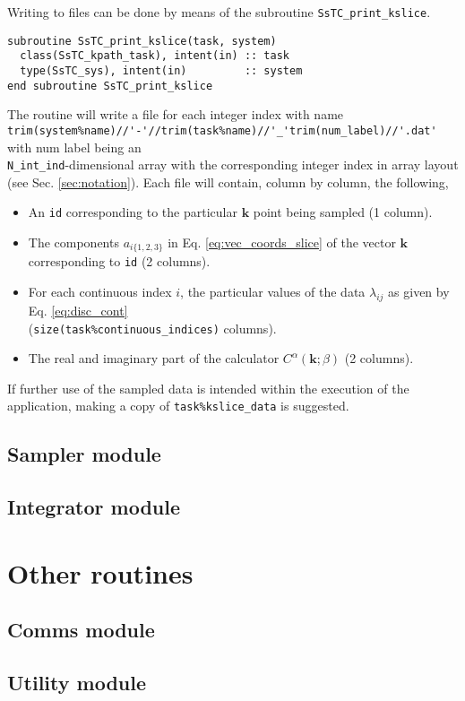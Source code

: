 \documentclass[10pt,a4paper]{article}
\begin{document}
Writing to files can be done by means of the subroutine \verb|SsTC_print_kslice|.
\begin{lstlisting}[caption={Interface of the ``kpath" printer.},captionpos=b]
subroutine SsTC_print_kslice(task, system)
  class(SsTC_kpath_task), intent(in) :: task
  type(SsTC_sys), intent(in)         :: system
end subroutine SsTC_print_kslice
\end{lstlisting}
The routine will write a file for each integer index with name \\ \verb|trim(system%name)//'-'//trim(task%name)//'_'trim(num_label)//'.dat'| with num label being an \\ \verb|N_int_ind|-dimensional array with the corresponding integer index in array layout (see Sec. \ref{sec:notation}). Each file will contain, column by column, the following,
\begin{itemize}
\item An \verb|id| corresponding to the particular $\bm{k}$ point being sampled (1 column).
\item The components $a_{i\{1, 2, 3\}}$ in Eq. \eqref{eq:vec_coords_slice} of the vector $\bm{k}$ corresponding to \verb|id| (2 columns).
\item For each continuous index $i$, the particular values of the data $\lambda_{ij}$ as given by Eq. \eqref{eq:disc_cont} \\ (\verb|size(task%continuous_indices)| columns).
\item The real and imaginary part of the calculator $C^{\alpha}(\bm{k};\beta)$ (2 columns).
\end{itemize}
If further use of the sampled data is intended within the execution of the application, making a copy of \verb|task%kslice_data| is suggested.
\subsection{Sampler module}
\subsection{Integrator module}
\section{Other routines}
\subsection{Comms module}
\subsection{Utility module}
\end{document}
